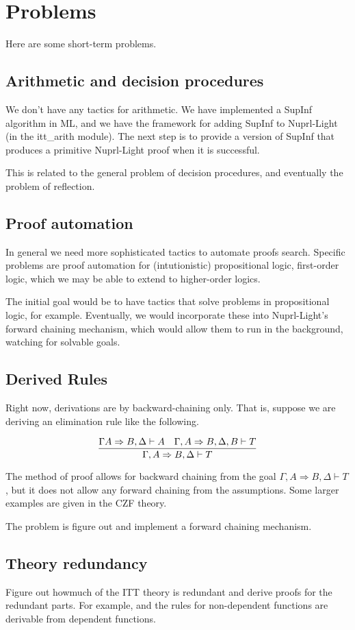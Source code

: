 \documentclass{article}
\begin{document}
\section{Problems}

Here are some short-term problems.

\subsection{Arithmetic and decision procedures}
We don't have any tactics for arithmetic.  We have implemented a
SupInf algorithm in ML, and we have the framework for adding SupInf to
Nuprl-Light (in the itt\_arith module).  The next step is to provide a
version of SupInf that produces a primitive Nuprl-Light proof when it
is successful.

This is related to the general problem of decision procedures, and
eventually the problem of reflection.

\subsection{Proof automation}
In general we need more sophisticated tactics to automate proofs
search.  Specific problems are proof automation for (intutionistic)
propositional logic, first-order logic, which we may be able to extend
to higher-order logics.

The initial goal would be to have tactics that solve problems in
propositional logic, for example.  Eventually, we would incorporate
these into Nuprl-Light's forward chaining mechanism, which would allow
them to run in the background, watching for solvable goals.

\subsection{Derived Rules}
Right now, derivations are by backward-chaining only.  That is,
suppose we are deriving an elimination rule like the following.

$$\infer{\Gamma, A \Rightarrow B, \Delta \vdash T}{\Gamma A
  \Rightarrow B, \Delta \vdash A & \Gamma, A
  \Rightarrow B, \Delta, B \vdash T}$$

The method of proof allows for backward chaining from the goal
$\Gamma, A \Rightarrow B, \Delta \vdash T$, but it does not allow any
forward chaining from the assumptions.  Some larger examples are given
in the CZF theory.

The problem is figure out and implement a forward chaining mechanism.

\subsection{Theory redundancy}
Figure out howmuch of the ITT theory is redundant and derive proofs
for the redundant parts.  For example, and the rules for non-dependent
functions are derivable from dependent functions.
\end{document}
